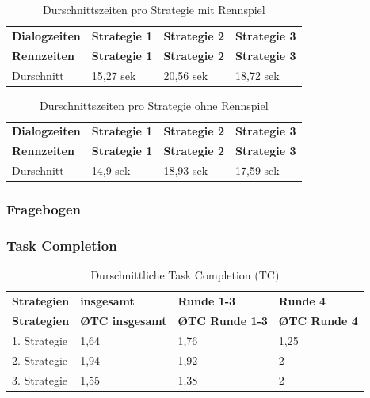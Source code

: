 \documentclass[12pt,a4paper]{scrartcl}
\begin{document}
\begin{longtable}{p{3cm}p{3cm}p{3cm}p{3cm} }
	\label{Dialogzeiten}\\
	\caption[Durschnittszeiten pro Strategie mit Rennspiel]{Durschnittszeiten pro Strategie mit Rennspiel}\\
	\hline
	\textbf{Dialogzeiten}&\textbf{Strategie 1}&\textbf{Strategie 2} &\textbf{Strategie 3}\\
	\hline
	\endfirsthead
	\hline
	\textbf{Rennzeiten}&\textbf{Strategie 1}&\textbf{Strategie 2} &\textbf{Strategie 3}\\
	\hline
	\endhead
Durschnitt & 15,27 sek & 20,56 sek & 18,72 sek \\


\hline
\end{longtable}

\begin{longtable}{p{3cm}p{3cm}p{3cm}p{3cm} }
	\label{DialogzeitenKCL}\\
	\caption[Durschnittszeiten pro Strategie ohne Rennspiel]{Durschnittszeiten pro Strategie ohne Rennspiel}\\
	\hline
	\textbf{Dialogzeiten}&\textbf{Strategie 1}&\textbf{Strategie 2} &\textbf{Strategie 3}\\
	\hline
	\endfirsthead
	\hline
	\textbf{Rennzeiten}&\textbf{Strategie 1}&\textbf{Strategie 2} &\textbf{Strategie 3}\\
	\hline
	\endhead
Durschnitt &  14,9 sek & 18,93 sek & 17,59 sek \\


\hline
\end{longtable}
\subsubsection{Fragebogen}
\subsubsection{Task Completion}
\begin{longtable}{p{3cm}p{3cm}p{3cm}p{3cm} }
	\label{Dialogzeiten}\\
	\caption[Durschnittliche Task Completion (TC)]{Durschnittliche Task Completion (TC)}\\
	\hline
	\textbf{Strategien}&\textbf{insgesamt}&\textbf{Runde 1-3} &\textbf{Runde 4}\\
	\hline
	\endfirsthead
	\hline
	\textbf{Strategien}&\textbf{\O TC insgesamt}&\textbf{\O TC Runde 1-3} &\textbf{\O TC Runde 4}\\
	\hline
	\endhead
1. Strategie & 1,64 & 1,76 & 1,25  \\
2. Strategie & 1,94 & 1,92 & 2  \\
3. Strategie & 1,55 & 1,38 & 2  \\
\hline
\end{longtable}
\end{document}
